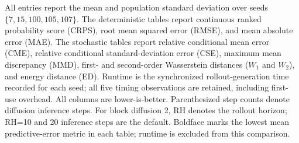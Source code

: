
\providecommand{\resultpm}[2]{\ensuremath{#1 \mathbin{\pm} #2}}
\providecommand{\bestresultpm}[2]{\ensuremath{\mathbf{#1} \mathbin{\pm} #2}}

All entries report the mean and population standard deviation over seeds
$\{7,15,100,105,107\}$.  The deterministic tables report continuous ranked
probability score (CRPS), root mean squared error (RMSE), and mean absolute
error (MAE).  The stochastic tables report relative conditional mean error
(CME), relative conditional standard-deviation error (CSE), maximum mean
discrepancy (MMD), first- and second-order Wasserstein distances ($W_1$ and
$W_2$), and energy distance (ED).  Runtime is the synchronized
rollout-generation time recorded for each seed; all five timing observations
are retained, including first-use overhead.  All columns are lower-is-better.
Parenthesized step counts denote diffusion inference steps.  For block
diffusion 2, RH denotes the rollout horizon; RH=10 and 20 inference steps are
the default.
Boldface marks the lowest mean predictive-error metric in each table; runtime
is excluded from this comparison.

